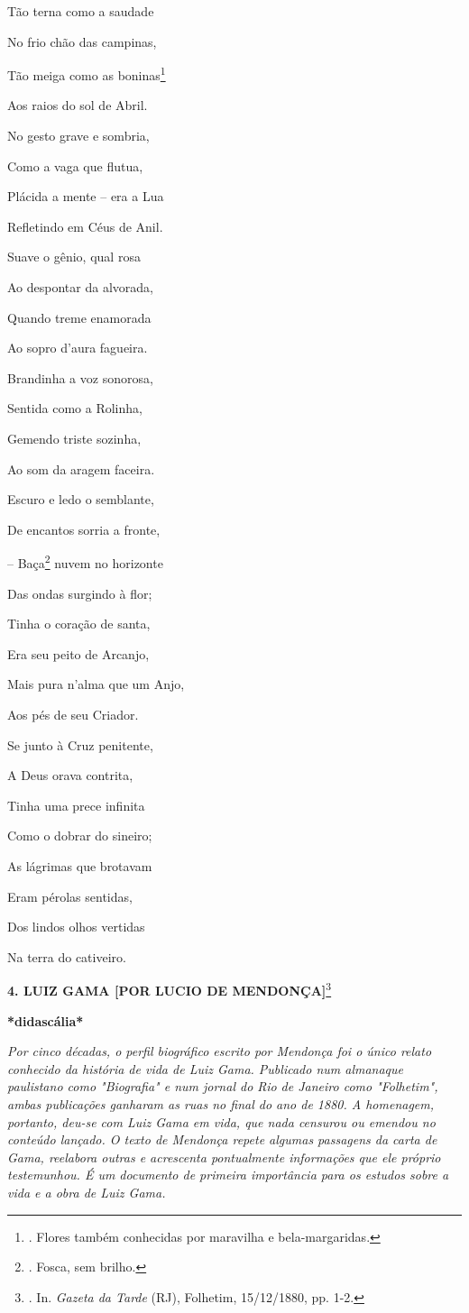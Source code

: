 Tão terna como a saudade

No frio chão das campinas,

Tão meiga como as boninas\footnote{. Flores também conhecidas por
  maravilha e bela-margaridas.}

Aos raios do sol de Abril.

No gesto grave e sombria,

Como a vaga que flutua,

Plácida a mente -- era a Lua

Refletindo em Céus de Anil.

Suave o gênio, qual rosa

Ao despontar da alvorada,

Quando treme enamorada

Ao sopro d'aura fagueira.

Brandinha a voz sonorosa,

Sentida como a Rolinha,

Gemendo triste sozinha,

Ao som da aragem faceira.

Escuro e ledo o semblante,

De encantos sorria a fronte,

-- Baça\footnote{. Fosca, sem brilho.} nuvem no horizonte

Das ondas surgindo à flor;

Tinha o coração de santa,

Era seu peito de Arcanjo,

Mais pura n'alma que um Anjo,

Aos pés de seu Criador.

Se junto à Cruz penitente,

A Deus orava contrita,

Tinha uma prece infinita

Como o dobrar do sineiro;

As lágrimas que brotavam

Eram pérolas sentidas,

Dos lindos olhos vertidas

Na terra do cativeiro.

\textbf{4. LUIZ GAMA {[}POR LUCIO DE MENDONÇA{]}}\footnote{. In.
  \emph{Gazeta da Tarde} (RJ), Folhetim, 15/12/1880, pp. 1-2.}

\textbf{*didascália*}

\emph{Por cinco décadas, o perfil biográfico escrito por Mendonça foi o
único relato conhecido da história de vida de Luiz Gama. Publicado num
almanaque paulistano como "Biografia" e num jornal do Rio de Janeiro
como "Folhetim", ambas publicações ganharam as ruas no final do ano de
1880. A homenagem, portanto, deu-se com Luiz Gama em vida, que nada
censurou ou emendou no conteúdo lançado. O texto de Mendonça repete
algumas passagens da carta de Gama, reelabora outras e acrescenta
pontualmente informações que ele próprio testemunhou. É um documento de
primeira importância para os estudos sobre a vida e a obra de Luiz Gama.
}


